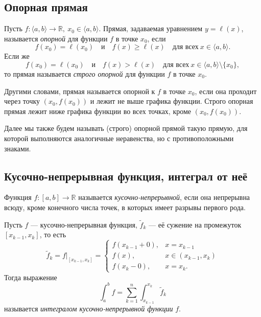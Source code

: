\subsection{Опорная прямая}

\begin{definition}
	Пусть \(f \colon \langle a, b \rangle \to \mathbb{R}, \ x_0 \in \langle a, b \rangle\). Прямая, задаваемая уравнением \(y = \ell(x)\), называется \textit{опорной} для функции  \(f\) в точке \(x_0\), если \[
		f(x_0) = \ell(x_0) \quad \text{и} \quad f(x) \geqslant \ell(x) \quad \text{для всех} \ x \in \langle a, b \rangle. 
	\]
	Если же \[
		f(x_0) = \ell(x_0) \quad \text{и} \quad f(x) > \ell(x) \quad \text{для всех} \ x \in \langle a, b \rangle \setminus \{x_0\},
	\]
	то прямая называется \textit{строго опорной} для функции \(f\) в точке \(x_0\).
	
	Другими словами, прямая называется опорной к \(f\) в точке \(x_0\), если она проходит через точку \((x_0, f(x_0))\) и лежит не выше графика функции. Строго опорная прямая лежит ниже графика функции во всех точках, кроме \((x_0, f(x_0))\).
\end{definition}

\begin{remark}
	Далее мы также будем называть (строго) опорной прямой такую прямую, для которой выполняются аналогичные неравенства, но с противоположными знаками.
\end{remark}

\subsection{Кусочно-непрерывная функция, интеграл от неё}

\begin{ndefinition}
	Функция \(f \colon [a, b] \to \mathbb{R}\) называется \textit{кусочно-непрерывной}, если она непрерывна всюду, кроме конечного числа точек, в которых имеет разрывы первого рода.
\end{ndefinition}

\begin{ndefinition}
	Пусть \(f\) --- кусочно-непрерывная функция, \(\widetilde{f}_k\) --- её сужение на промежуток \([x_{k - 1}, x_k]\), то есть \[
		\widetilde{f}_k = f \big|_{[x_{k - 1}, x_k]} =
		\begin{cases}
			f(x_{k - 1} + 0), & x = x_{k - 1} 		   \\
			f(x),			  & x \in (x_{k - 1}, x_k) \\
			f(x_k - 0),		  & x = x_k.
		\end{cases}
	\]
	Тогда выражение \[
		\int_a^b f = \sum_{k = 1}^n \int_{x_{k - 1}}^{x_k} \widetilde{f}_k
	\]
	называется \textit{интегралом кусочно-непрерывной функции} \(f\).
\end{ndefinition}

